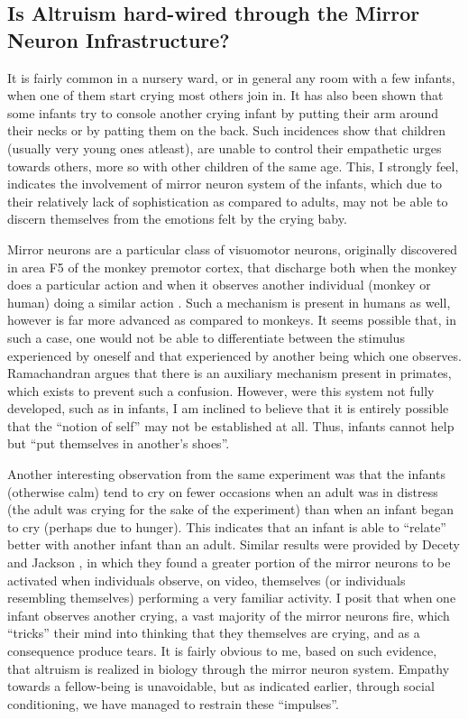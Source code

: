 \documentclass[12pt, letter]{article}
\begin{document}
\subsection*{Is Altruism hard-wired through the Mirror Neuron Infrastructure?}
It is fairly common in a nursery ward, or in general any room with a few infants, when one of them start crying most others join in. It has also been shown that some infants try to console another crying infant by putting their arm around their necks or by patting them on the back. Such incidences show that children (usually very young ones atleast), are unable to control their empathetic urges towards others, more so with other children of the same age. This, I strongly feel, indicates the involvement of mirror neuron system of the infants, which due to their relatively lack of sophistication as compared to adults, may not be able to discern themselves from the emotions felt by the crying baby. 

Mirror neurons are a particular class of visuomotor neurons, originally discovered in area F5 of the monkey premotor cortex, that discharge both when the monkey does a particular action and when it observes another individual (monkey or human) doing a similar action \cite{rizzolatti2004mirror}. Such a mechanism is present in humans as well, however is far more advanced as compared to monkeys. It seems possible that, in such a case, one would not be able to differentiate between the stimulus experienced by oneself and that experienced by another being which one observes. Ramachandran \cite{ramachandran2000mirror} argues that there is an auxiliary mechanism present in primates, which exists to prevent such a confusion.  However, were this system not fully developed, such as in infants, I am inclined to believe that it is entirely possible that the ``notion of self'' may not be established at all. Thus, infants cannot help but ``put themselves in  another's shoes''.

Another interesting observation from the same experiment was that the infants (otherwise calm) tend to cry on fewer occasions when an adult was in distress (the adult was crying for the sake of the experiment) than when an infant began to cry (perhaps due to hunger). This indicates that an infant is able to ``relate'' better with another infant than an adult. Similar results were provided by Decety and Jackson \cite{decety2006social}, in which they found a greater portion of the mirror neurons to be activated when individuals observe, on video, themselves (or individuals resembling themselves) performing a very familiar activity. I posit that when one infant observes another crying, a vast majority of the mirror neurons fire, which ``tricks'' their mind into thinking that they themselves are crying, and as a consequence produce tears. It is fairly obvious to me, based on such evidence, that altruism is realized in biology through the mirror neuron system. Empathy towards a fellow-being is unavoidable, but as indicated earlier, through social conditioning, we have managed to restrain these ``impulses''.
\end{document}
